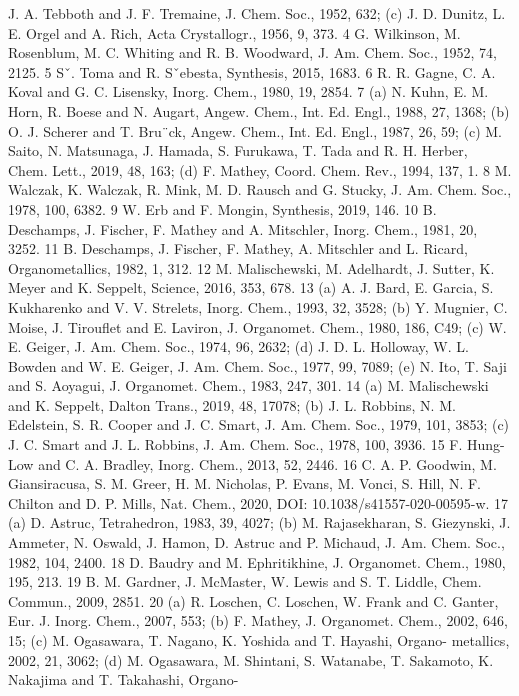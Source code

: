 \documentclass{article}
\begin{document}
J. A. Tebboth and J. F. Tremaine, J. Chem. Soc., 1952, 632; (c) J. D. Dunitz,
L. E. Orgel and A. Rich, Acta Crystallogr., 1956, 9, 373.
4 G. Wilkinson, M. Rosenblum, M. C. Whiting and R. B. Woodward,
J. Am. Chem. Soc., 1952, 74, 2125.
5 Sˇ. Toma and R. Sˇebesta, Synthesis, 2015, 1683.
6 R. R. Gagne, C. A. Koval and G. C. Lisensky, Inorg. Chem., 1980,
19, 2854.
7 (a) N. Kuhn, E. M. Horn, R. Boese and N. Augart, Angew. Chem., Int.
Ed. Engl., 1988, 27, 1368; (b) O. J. Scherer and T. Bru¨ck, Angew.
Chem., Int. Ed. Engl., 1987, 26, 59; (c) M. Saito, N. Matsunaga,
J. Hamada, S. Furukawa, T. Tada and R. H. Herber, Chem. Lett.,
2019, 48, 163; (d) F. Mathey, Coord. Chem. Rev., 1994, 137, 1.
8 M. Walczak, K. Walczak, R. Mink, M. D. Rausch and G. Stucky, J. Am.
Chem. Soc., 1978, 100, 6382.
9 W. Erb and F. Mongin, Synthesis, 2019, 146.
10 B. Deschamps, J. Fischer, F. Mathey and A. Mitschler, Inorg. Chem.,
1981, 20, 3252.
11 B. Deschamps, J. Fischer, F. Mathey, A. Mitschler and L. Ricard,
Organometallics, 1982, 1, 312.
12 M. Malischewski, M. Adelhardt, J. Sutter, K. Meyer and K. Seppelt,
Science, 2016, 353, 678.
13 (a) A. J. Bard, E. Garcia, S. Kukharenko and V. V. Strelets, Inorg.
Chem., 1993, 32, 3528; (b) Y. Mugnier, C. Moise, J. Tirouflet and
E. Laviron, J. Organomet. Chem., 1980, 186, C49; (c) W. E. Geiger,
J. Am. Chem. Soc., 1974, 96, 2632; (d) J. D. L. Holloway, W. L. Bowden
and W. E. Geiger, J. Am. Chem. Soc., 1977, 99, 7089; (e) N. Ito, T. Saji
and S. Aoyagui, J. Organomet. Chem., 1983, 247, 301.
14 (a) M. Malischewski and K. Seppelt, Dalton Trans., 2019, 48, 17078;
(b) J. L. Robbins, N. M. Edelstein, S. R. Cooper and J. C. Smart, J. Am.
Chem. Soc., 1979, 101, 3853; (c) J. C. Smart and J. L. Robbins, J. Am.
Chem. Soc., 1978, 100, 3936.
15 F. Hung-Low and C. A. Bradley, Inorg. Chem., 2013, 52, 2446.
16 C. A. P. Goodwin, M. Giansiracusa, S. M. Greer, H. M. Nicholas,
P. Evans, M. Vonci, S. Hill, N. F. Chilton and D. P. Mills, Nat. Chem.,
2020, DOI: 10.1038/s41557-020-00595-w.
17 (a) D. Astruc, Tetrahedron, 1983, 39, 4027; (b) M. Rajasekharan,
S. Giezynski, J. Ammeter, N. Oswald, J. Hamon, D. Astruc and
P. Michaud, J. Am. Chem. Soc., 1982, 104, 2400.
18 D. Baudry and M. Ephritikhine, J. Organomet. Chem., 1980, 195,
213.
19 B. M. Gardner, J. McMaster, W. Lewis and S. T. Liddle, Chem.
Commun., 2009, 2851.
20 (a) R. Loschen, C. Loschen, W. Frank and C. Ganter, Eur. J. Inorg.
Chem., 2007, 553; (b) F. Mathey, J. Organomet. Chem., 2002, 646, 15;
(c) M. Ogasawara, T. Nagano, K. Yoshida and T. Hayashi, Organo-
metallics,
2002,
21,
3062;
(d)
M.
Ogasawara,
M.
Shintani,
S. Watanabe, T. Sakamoto, K. Nakajima and T. Takahashi, Organo-
\end{document}
